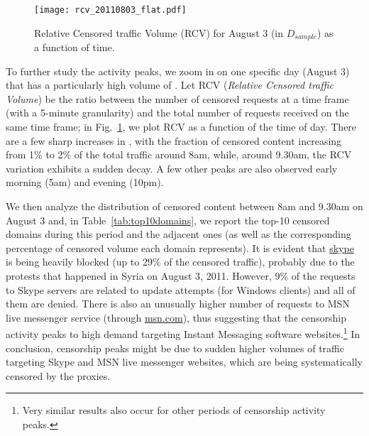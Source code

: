 \documentclass{sig-alternate-2013}
\newcommand{\red}[1] {{\color{black}{#1}}}
\begin{document}
\begin{figure} [t!]
\centering
 \texttt{[image: rcv\_20110803\_flat.pdf]}
\vspace{-0.2cm}
\caption{Relative Censored traffic Volume (RCV) for August 3 (in $D_{sample}$) as a function of time.}\label{fig:rcv}
\end{figure} 




To further study the activity peaks, we zoom in on one specific day (August 3) that has a particularly high volume of \red{censored traffic}.  Let RCV  ({\em Relative Censored traffic Volume}) be the ratio between
the number of censored requests at a time frame (with a 5-minute granularity) and the total number of requests received on the same time frame; in
Fig.~\ref{fig:rcv}, we plot RCV as a function of the time of day. 
There are a few sharp increases in \red{censored traffic}, with the fraction of censored content increasing from 1\% to 2\% of the total traffic around 8am, while, around 9.30am, the RCV variation exhibits a sudden decay. A few other peaks are also observed early morning (5am) and evening (10pm).
 
We then analyze the distribution of censored content between 8am and 9.30am on August 3 and, in  Table~\ref{tab:top10domains}, we report the top-10 censored domains during this period and the adjacent ones (as well as the corresponding percentage of censored volume each domain represents). 
It is evident that \url{skype} is being heavily blocked (up to 29\% of the censored traffic), probably due to the protests that happened in Syria on August 3, 2011. However, 
9\% of the requests to Skype servers are related to update attempts (for Windows clients) and all of them are denied. There is also an unusually higher number of requests to MSN live messenger service (through \url{msn.com}), thus suggesting
that the censorship activity peaks \red{might perhaps be correlated} to high demand targeting Instant Messaging software websites.\footnote{Very similar results also occur for other periods of censorship activity peaks.} In conclusion, censorship peaks might be due to sudden higher volumes of traffic targeting Skype and MSN live messenger websites, which are being systematically censored by the proxies. 
\end{document}
